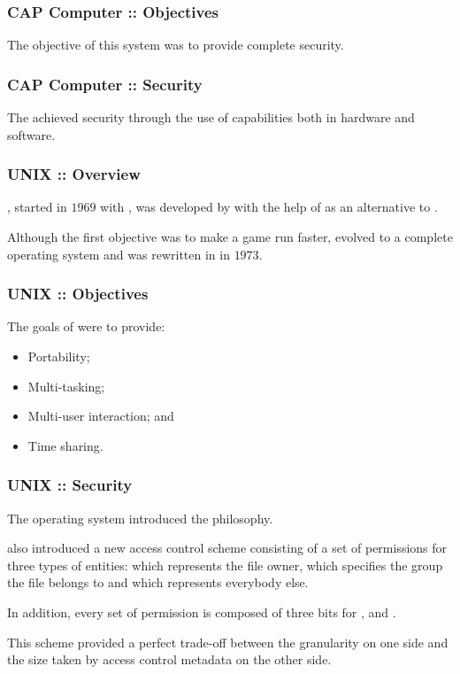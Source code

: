 
\begin{frame}
  \frametitle{CAP Computer :: Objectives}

  The objective of this system was to provide complete security.
\end{frame}


\begin{frame}
  \frametitle{CAP Computer :: Security}

  The  achieved security through the use of capabilities
  both in hardware and software.
\end{frame}


\begin{frame}
  \frametitle{UNIX :: Overview}

  , started in $1969$ with , was developed by
   with the help of  as an alternative
  to .

  \-

  Although the first objective was to make a game run faster, 
  evolved to a complete operating system and was rewritten in 
  in $1973$.
\end{frame}


\begin{frame}
  \frametitle{UNIX :: Objectives}

  The goals of  were to provide:

  \begin{itemize}
    \item
      Portability;
    \item
      Multi-tasking;
    \item
      Multi-user interaction; and
    \item
      Time sharing.
  \end{itemize}
\end{frame}


\begin{frame}
  \frametitle{UNIX :: Security}

  The  operating system introduced the 
  philosophy.

  \-

   also introduced a new access control scheme consisting of a
  set of permissions for three types of entities:  which represents
  the file owner,  which specifies the group the file belongs
  to and  which represents everybody else.

  \-

  In addition, every set of permission is composed of three bits 
  for ,  and .

  \-

  This scheme provided a perfect trade-off between the granularity on one
  side and the size taken by access control metadata on the other side.
\end{frame}

